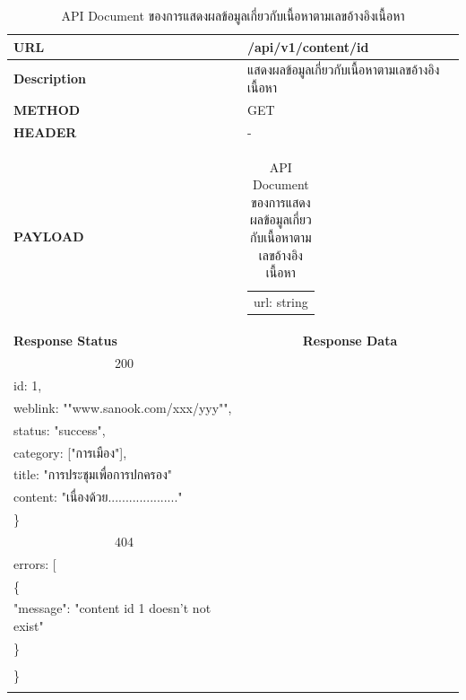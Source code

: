 \documentclass[12pt,oneside,openright,a4paper]{cpe-thai-project}
\begin{document}
\begin{itemize}
\begin{longtable}[!ht]{p{3cm}|p{8cm}}
  \caption{API Document ของการแสดงผลข้อมูลเกี่ยวกับเนื้อหาตามเลขอ้างอิงเนื้อหา  }\label{tbl:api_content_id} 
    \endfirsthead
    \endhead
    \hhline{==} 
    \textbf{URL}              & /api/v1/content/{id}                                                                                             \\ \hline
    \textbf{Description}      & แสดงผลข้อมูลเกี่ยวกับเนื้อหาตามเลขอ้างอิงเนื้อหา                                                                                     \\ \hline
    \textbf{METHOD}           & GET                                                                                                                 \\ \hline
    \textbf{HEADER}           & -                                                                                         \\ \hline
    \textbf{PAYLOAD}          & \begin{tabular}[c]{@{}l@{}}url: string\end{tabular}  \\ \hline \newpage \hline
    \textbf{Response Status}  & \multicolumn{1}{c}{\textbf{Response Data}}                                                                          \\ \hline
    \multicolumn{1}{c|}{200}  &
    \begin{tabular}[c]{@{}l@{}}\{\\ \quad id: 1,\\ \quad weblink: ""www.sanook.com/xxx/yyy"",\\ \quad status: "success",\\ 
      \quad category: {[}"การเมือง"{]},\\ \quad title: "การประชุมเพื่อการปกครอง"\\ \quad content: "เนื่องด้วย...................."\\ \}\end{tabular}  \\ \hline
    \multicolumn{1}{c|}{404}  &
    \begin{tabular}[c]{@{}l@{}}\{\\ \quad errors: {[}\\ \quad\quad\{\\ \quad\quad\quad"message": "content id 1 doesn't not exist"\\ \quad\quad\}\\\quad {]}\\ \}\end{tabular}                                                                         \\ \hline
    \hhline{==} 
\end{longtable}



\end{itemize}
\end{document}
